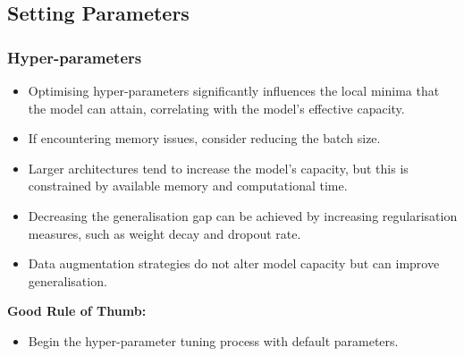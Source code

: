     
\subsection{Setting Parameters}
\subsubsection*{Hyper-parameters}
\begin{itemize}
    \item Optimising hyper-parameters significantly influences the local minima that the model can attain, correlating with the model's effective capacity.
    \item If encountering memory issues, consider reducing the batch size.
    \item Larger architectures tend to increase the model's capacity, but this is constrained by available memory and computational time.
    \item Decreasing the generalisation gap can be achieved by increasing regularisation measures, such as weight decay and dropout rate.
    \item Data augmentation strategies do not alter model capacity but can improve generalisation.
\end{itemize}

\textbf{Good Rule of Thumb:}
\begin{itemize}
    \item Begin the hyper-parameter tuning process with default parameters.
\end{itemize}

